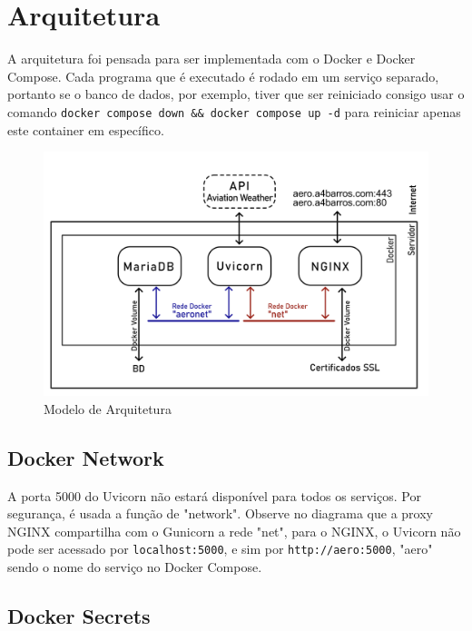 \chapter{Arquitetura}

A arquitetura foi pensada para ser implementada com o Docker e Docker Compose. Cada
programa que é executado é rodado em um serviço separado, portanto se o banco de dados,
por exemplo, tiver que ser reiniciado consigo usar o comando \texttt{docker compose down && docker compose up -d}
para reiniciar apenas este container em específico.

\begin{figure}[ht]
    \begin{center}
    \includegraphics[width=\linewidth]{img/diagrama-arquitetura.png}
    \caption{Modelo de Arquitetura}
    \label{fig:arquitetura}
    \end{center}
\end{figure}

\section{Docker Network}
A porta 5000 do Uvicorn não estará disponível para todos os serviços. Por segurança, é usada a função de
"network". Observe no diagrama que a proxy NGINX compartilha com o Gunicorn a rede "net", para o NGINX,
o Uvicorn não pode ser acessado por \texttt{localhost:5000}, e sim por \texttt{http://aero:5000}, "aero"
sendo o nome do serviço no Docker Compose.


\section{Docker Secrets}


